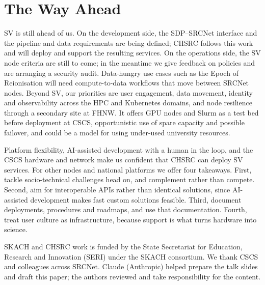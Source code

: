\documentclass[11pt,twoside]{article}
\begin{document}
\section{The Way Ahead}

SV is still ahead of us. On the development side, the SDP--SRCNet interface and the pipeline and data requirements are being defined; CHSRC follows this work and will deploy and support the resulting services. On the operations side, the SV node criteria are still to come; in the meantime we give feedback on policies and are arranging a security audit. Data-hungry use cases such as the Epoch of Reionisation will need compute-to-data workflows that move between SRCNet nodes. Beyond SV, our priorities are user engagement, data movement, identity and observability across the HPC and Kubernetes domains, and node resilience through a secondary site at FHNW. It offers GPU nodes and Slurm as a test bed before deployment at CSCS, opportunistic use of spare capacity and possible failover, and could be a model for using under-used university resources.

Platform flexibility, AI-assisted development with a human in the loop, and the CSCS hardware and network make us confident that CHSRC can deploy SV services. For other nodes and national platforms we offer four takeaways. First, tackle socio-technical challenges head on, and complement rather than compete. Second, aim for interoperable APIs rather than identical solutions, since AI-assisted development makes fast custom solutions feasible. Third, document deployments, procedures and roadmaps, and use that documentation. Fourth, treat user culture as infrastructure, because support is what turns hardware into science.

\acknowledgements SKACH and CHSRC work is funded by the State Secretariat for Education, Research and Innovation (SERI) under the SKACH consortium. We thank CSCS and colleagues across SRCNet. Claude (Anthropic) helped prepare the talk slides and draft this paper; the authors reviewed and take responsibility for the content.



\end{document}
